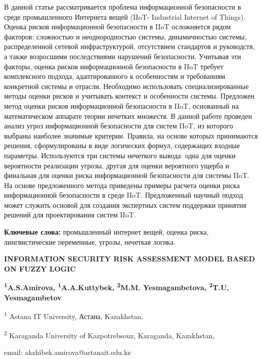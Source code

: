 В данной статье рассматривается проблема информационной безопасности в
среде промышленного Интернета вещей (IIoT- Industrial Internet of
Things). Оценка рисков информационной безопасности в IIoT осложняется
рядом факторов: сложностью и неоднородностью системы, динамичностью
системы, распределенной сетевой инфраструктурой, отсутствием стандартов
и руководств, а также возросшими последствиями нарушений безопасности.
Учитывая эти факторы, оценка рисков информационной безопасности в IIoT
требует комплексного подхода, адаптированного к особенностям и
требованиям конкретной системы и отрасли. Необходимо использовать
специализированные методы оценки рисков и учитывать контекст и
особенности системы. Предложен метод оценки рисков информационной
безопасности в IIoT, основанный на математическом аппарате теории
нечетких множеств. В данной работе проведен анализ угроз информационной
безопасности для систем IIoT, из которого выбраны наиболее значимые
критерии. Правила, на основе которых принимаются решения, сформулированы
в виде логических формул, содержащих входные параметры. Используются три
системы нечеткого вывода: одна для оценки вероятности реализации угрозы,
другая для оценки вероятного ущерба и финальная для оценки риска
информационной безопасности для системы IIoT. На основе предложенного
метода приведены примеры расчета оценки риска информационной
безопасности в среде IIoT. Предложенный научный подход может служить
основой для создания экспертных систем поддержки принятия решений для
проектирования систем IIoT.

{\bfseries Ключевые слова:} промышленный интернет вещей, оценка риска,
лингвистические переменные, угрозы, нечеткая логика.

{\bfseries INFORMATION SECURITY RISK ASSESSMENT MODEL BASED ON FUZZY LOGIC}

{\bfseries \textsuperscript{1}A.S.Amirova\textsuperscript{\envelope },
\textsuperscript{1}A.A.Kuttybek, \textsuperscript{2}M.M. Yesmagambetova,
\textsuperscript{2}T.U. Yesmagambetov}

\textsuperscript{1} Astana IT University, Астана, Kazakhstan,

\textsuperscript{2} Karaganda University of Kazpotrebsouz, Karaganda,
Kazakhstan,

email: akzhibek.amirova@astanait.edu.kz


